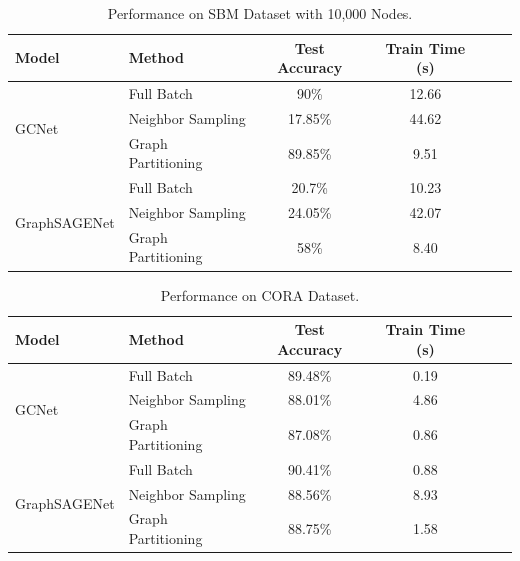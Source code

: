 \documentclass{article}
\begin{document}
\begin{table}[H]
    \centering
    \caption{Performance on SBM Dataset with 10,000 Nodes.}
    \label{tab:sbm_10000}
    \begin{tabular}{|l|l|c|c|c|c|}
        \hline
        \textbf{Model} & \textbf{Method} & \textbf{Test Accuracy} & \textbf{Train Time (s)} \\ \hline
        \multirow{3}{*}{GCNet} & Full Batch & 90\% & 12.66 \\ \cline{2-4}
                              & Neighbor Sampling & 17.85\% & 44.62 \\ \cline{2-4}
                              & Graph Partitioning & 89.85\% & 9.51 \\ \hline
        \multirow{3}{*}{GraphSAGENet} & Full Batch & 20.7\% & 10.23 \\ \cline{2-4}
                                      & Neighbor Sampling & 24.05\% & 42.07 \\ \cline{2-4}
                                      & Graph Partitioning & 58\% & 8.40 \\ \hline
    \end{tabular}
\end{table}

\begin{table}[H]
    \centering
    \caption{Performance on CORA Dataset.}
    \label{tab:cora}
    \begin{tabular}{|l|l|c|c|c|c|}
        \hline
        \textbf{Model} & \textbf{Method} & \textbf{Test Accuracy} & \textbf{Train Time (s)} \\ \hline
        \multirow{3}{*}{GCNet} & Full Batch & 89.48\% & 0.19 \\ \cline{2-4}
                              & Neighbor Sampling & 88.01\% & 4.86 \\ \cline{2-4}
                              & Graph Partitioning & 87.08\% & 0.86 \\ \hline
        \multirow{3}{*}{GraphSAGENet} & Full Batch & 90.41\% & 0.88 \\ \cline{2-4}
                                      & Neighbor Sampling & 88.56\% & 8.93 \\ \cline{2-4}
                                      & Graph Partitioning & 88.75\% & 1.58 \\ \hline
    \end{tabular}
\end{table}
\end{document}
